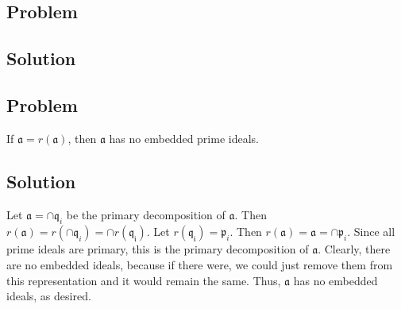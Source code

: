 \documentclass[book,12pt,oneside,openany]{memoir}
\begin{document}
\subsection{Problem}

\subsection{Solution}

\subsection{Problem}
If $\mathfrak{a} = r(\mathfrak{a})$, then $\mathfrak{a}$ has no embedded prime ideals.

\subsection{Solution}
Let $\mathfrak{a} = \cap \mathfrak{q}_i$ be the primary decomposition of $\mathfrak{a}$. Then $r(\mathfrak{a}) = r(\cap \mathfrak{q}_i) = \cap r(\mathfrak{q_i})$. Let $r(\mathfrak{q_i}) = \mathfrak{p}_i$. Then $r(\mathfrak{a}) = \mathfrak{a} = \cap \mathfrak{p}_i$. Since all prime ideals are primary, this is the primary decomposition of $\mathfrak{a}$. Clearly, there are no embedded ideals, because if there were, we could just remove them from this representation and it would remain the same. Thus, $\mathfrak{a}$ has no embedded ideals, as desired.
\end{document}
